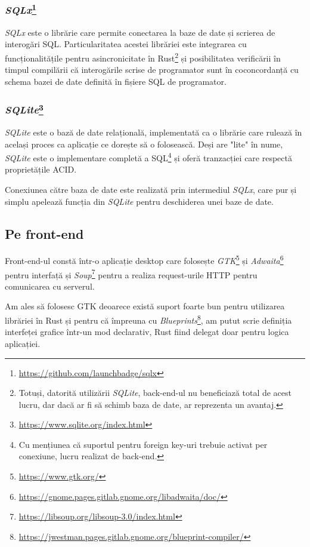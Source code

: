 \documentclass{article}
\begin{document}
    \subsubsection*{\emph{SQLx}\footnote{\url{https://github.com/launchbadge/sqlx}}}

    \emph{SQLx} este o librărie care permite conectarea la baze de date și scrierea de interogări SQL.
    Particularitatea acestei librăriei este integrarea cu funcționalitățile pentru asincronicitate în
    Rust\footnote{Totuși, datorită utilizării \emph{SQLite}, back-end-ul nu beneficiază total de acest lucru,
    dar dacă ar fi să schimb baza de date, ar reprezenta un avantaj.} și posibilitatea verificării în timpul
    compilării că interogările scrise de programator sunt în coconcordanță cu schema bazei de date definită
    în fișiere SQL de programator.

    \subsubsection*{\emph{SQLite}\footnote{\url{https://www.sqlite.org/index.html}}}

    \emph{SQLite} este o bază de date relațională, implementată ca o librărie care rulează în același proces ca
    aplicație ce dorește să o folosească. Deși are "lite" în nume, \emph{SQLite} este o implementare completă a
    SQL\footnote{Cu mențiunea că suportul pentru foreign key-uri trebuie activat per conexiune, lucru realizat de
    back-end.} și oferă tranzacției care respectă proprietățile ACID.

    Conexiunea către baza de date este realizată prin intermediul \emph{SQLx}, care pur și simplu apelează funcția
    din \emph{SQLite} pentru deschiderea unei baze de date.

    \subsection{Pe front-end}

    Front-end-ul constă într-o aplicație desktop care folosește \emph{GTK}\footnote{\url{https://www.gtk.org/}}
    și \emph{Adwaita}\footnote{\url{https://gnome.pages.gitlab.gnome.org/libadwaita/doc/}} pentru interfață și
    \emph{Soup}\footnote{\url{https://libsoup.org/libsoup-3.0/index.html}} pentru a realiza request-urile HTTP
    pentru comunicarea cu serverul.

    Am ales să folosesc GTK deoarece există suport foarte bun pentru utilizarea librăriei în Rust și pentru
    că împreuna cu \emph{Blueprints}\footnote{\url{https://jwestman.pages.gitlab.gnome.org/blueprint-compiler/}},
    am putut scrie definiția interfeței grafice într-un mod declarativ, Rust fiind delegat doar pentru logica
    aplicației.
\end{document}
